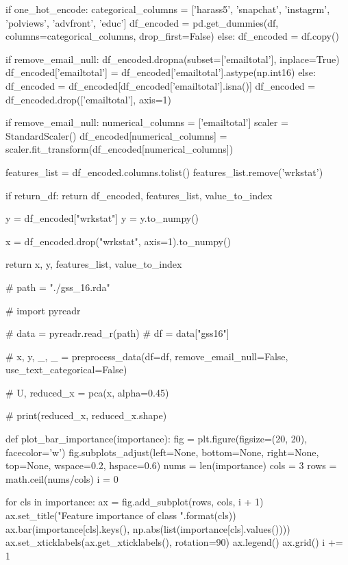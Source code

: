 \begin{python}
            
    if one_hot_encode:
        categorical_columns = ['harass5', 'snapchat', 'instagrm', 'polviews', 'advfront', 'educ']
        df_encoded = pd.get_dummies(df, columns=categorical_columns, drop_first=False)
    else:
        df_encoded = df.copy()
        
    if remove_email_null:
        df_encoded.dropna(subset=['emailtotal'], inplace=True)
        df_encoded['emailtotal'] = df_encoded['emailtotal'].astype(np.int16)
    else:
        df_encoded = df_encoded[df_encoded['emailtotal'].isna()]
        df_encoded = df_encoded.drop(['emailtotal'], axis=1)
    
    if remove_email_null:
        numerical_columns = ['emailtotal']
        scaler = StandardScaler()
        df_encoded[numerical_columns] = scaler.fit_transform(df_encoded[numerical_columns])
        
    features_list = df_encoded.columns.tolist()
    features_list.remove('wrkstat')
    
    if return_df:
        return df_encoded, features_list, value_to_index
    
    y = df_encoded["wrkstat"]
    y = y.to_numpy()

    x = df_encoded.drop("wrkstat", axis=1).to_numpy()
    
    return x, y, features_list, value_to_index


# path = "./gss_16.rda"

# import pyreadr

# data = pyreadr.read_r(path)
# df = data["gss16"]

# x, y, _, _ = preprocess_data(df=df, remove_email_null=False, use_text_categorical=False)

# U, reduced_x = pca(x, alpha=0.45)

# print(reduced_x, reduced_x.shape)


def plot_bar_importance(importance):
    fig = plt.figure(figsize=(20, 20), facecolor='w')
    fig.subplots_adjust(left=None, bottom=None, right=None, top=None, wspace=0.2, hspace=0.6)
    nums = len(importance)
    cols = 3
    rows = math.ceil(nums/cols)
    i = 0

    for cls in importance:
        ax = fig.add_subplot(rows, cols, i + 1)
        ax.set_title("Feature importance of class {}".format(cls))
        ax.bar(importance[cls].keys(), np.abs(list(importance[cls].values())))
        ax.set_xticklabels(ax.get_xticklabels(), rotation=90)
        ax.legend()
        ax.grid()
        i += 1
        

\end{python}
